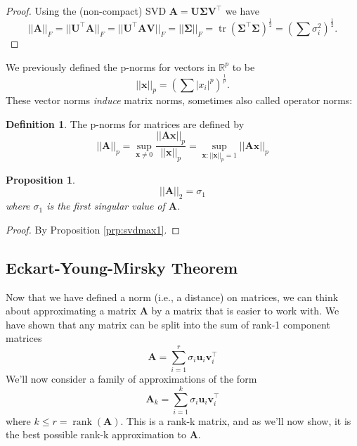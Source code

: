 \documentclass[
]{book}
\newtheorem{proposition}{Proposition}[chapter]
\theoremstyle{definition}
\newtheorem{definition}{Definition}[chapter]
\theoremstyle{definition}
\theoremstyle{definition}
\theoremstyle{definition}
\theoremstyle{remark}
\begin{document}
\begin{proof}
Using the (non-compact) SVD
\(\mathbf A= \mathbf U\boldsymbol{\Sigma}\mathbf V^\top\)
we have \[||\mathbf A||_F=||\mathbf U^\top \mathbf A||_F = ||\mathbf U^\top \mathbf A\mathbf V||_F = ||\boldsymbol{\Sigma}||_F=\operatorname{tr}(\boldsymbol{\Sigma}^\top\boldsymbol{\Sigma})^\frac{1}{2}=\left(\sum \sigma_i^2 \right)^\frac{1}{2}.\]
\end{proof}

We previously defined the p-norms for vectors in \(\mathbb{R}^p\) to be
\[||\mathbf x||_p = \left(\sum |x_i|^p\right)^{\frac{1}{p}}.\]
These vector norms \emph{induce} matrix norms, sometimes also called operator norms:

\begin{definition}
\protect\hypertarget{def:matrixnorm}{}\label{def:matrixnorm}The p-norms for matrices are defined by
\[||\mathbf A||_p = \sup_{\mathbf x\not=0} \frac{||\mathbf A\mathbf x||_p}{||\mathbf x||_p} = \sup_{\mathbf x: ||\mathbf x||_p=1} ||\mathbf A\mathbf x||_p\]
\end{definition}

\begin{proposition}
\protect\hypertarget{prp:L2matrixnorm}{}\label{prp:L2matrixnorm}\[||\mathbf A||_2 = \sigma_1\]
where \(\sigma_1\) is the first singular value of \(\mathbf A\).
\end{proposition}

\begin{proof}
By Proposition \ref{prp:svdmax1}.
\end{proof}

\hypertarget{eckart-young-mirsky-theorem}{%
\subsection{Eckart-Young-Mirsky Theorem}\label{eckart-young-mirsky-theorem}}

Now that we have defined a norm (i.e., a distance) on matrices, we can think about approximating a matrix \(\mathbf A\) by a matrix that is easier to work with. We have shown that any matrix can be split into the sum of rank-1 component matrices
\[\mathbf A= \sum_{i=1}^r \sigma_i \mathbf u_i \mathbf v_i^\top\]
We'll now consider a family of approximations of the form
\begin{equation}
\mathbf A_k = \sum_{i=1}^k \sigma_i \mathbf u_i \mathbf v_i^\top
\label{eq:svdreduced}
\end{equation}
where \(k\leq r=\operatorname{rank}(\mathbf A)\). This is a rank-k matrix, and as we'll now show, it is the best possible rank-k approximation to \(\mathbf A\).
\end{document}
